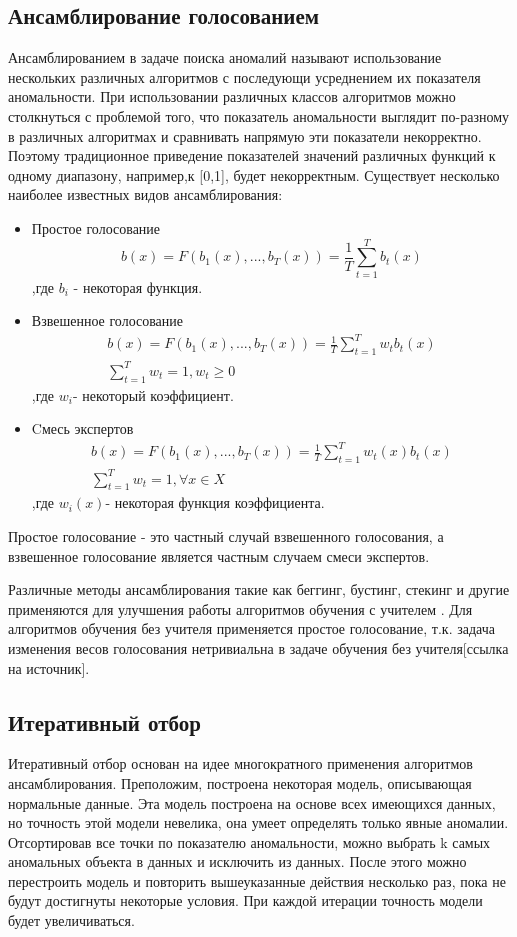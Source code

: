 \subsection*{Ансамблирование голосованием}
Ансамблированием в задаче поиска аномалий называют использование нескольких различных алгоритмов с последующи усреднением их показателя аномальности. При использовании различных классов алгоритмов можно столкнуться с проблемой того, что показатель аномальности выглядит по-разному в различных алгоритмах и сравнивать напрямую эти показатели некорректно.  Поэтому традиционное приведение  показателей значений различных функций к одному диапазону, например,к [0,1], будет некорректным.
Существует несколько наиболее известных видов ансамблирования:
\begin{itemize}
	\item Простое голосование 
	\begin{equation*}
	b(x)=F(b_1(x),...,b_T(x))=\frac{1}{T}\sum_{t=1}^{T}b_t(x)
	\end{equation*}
	,где $b_i$ -  некоторая функция.
	\item Взвешенное голосование 
	\begin{gather*}
	b(x)=F(b_1(x),...,b_T(x))=\frac{1}{T}\sum_{t=1}^{T}w_tb_t(x)\\
		\sum_{t=1}^{T}w_t=1, w_t \geq 0
	\end{gather*}
	,где $w_i$- некоторый коэффициент.
		\item Cмесь экспертов
		\begin{gather*}
		b(x)=F(b_1(x),...,b_T(x))=\frac{1}{T}\sum_{t=1}^{T}w_t(x)b_t(x)\\
		\sum_{t=1}^{T}w_t=1, \forall x\in X
		\end{gather*}
		,где $w_i(x)$- некоторая функция коэффициента.
 \end{itemize}
	Простое голосование - это  частный случай взвешенного голосования, а взвешенное голосование является частным случаем смеси экспертов. 
	
	Различные методы ансамблирования такие как беггинг, бустинг, стекинг и другие применяются для улучшения работы алгоритмов обучения с учителем . Для алгоритмов обучения без учителя применяется простое голосование, т.к. задача изменения весов голосования нетривиальна в задаче обучения без учителя[ссылка на источник].
\subsection*{Итеративный отбор}
Итеративный отбор основан на идее многократного применения алгоритмов ансамблирования. Преположим, построена некоторая модель, описывающая нормальные данные. Эта модель построена на основе всех  имеющихся данных, но точность этой модели невелика, она умеет определять только явные аномалии. Отсортировав все точки по показателю аномальности, можно выбрать k самых аномальных объекта в данных и исключить из данных. После этого можно перестроить модель и повторить вышеуказанные действия несколько раз, пока не будут достигнуты некоторые условия. При каждой итерации точность модели будет увеличиваться.

